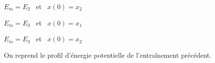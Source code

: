 
\begin{enonce}
$E_m=E_2$ \ et \ $ x(0)=x_2$
\end{enonce}

\reponse{\reponseB{}}




\begin{enonce}
$E_m=E_3$ \ et \ $ x(0)=x_1$
\end{enonce}

\reponse{\reponseB{}}




\begin{enonce}
$E_m=E_3$ \ et \ $ x(0)=x_2$
\end{enonce}

\reponse{\reponseB{}}


\finEntrainement


\newpage



\hauteurLargeurCadreReponse		{7mm}{2cm}
\initialisationEntrainement

On reprend le profil d'énergie potentielle de l'entraînement précédent.

